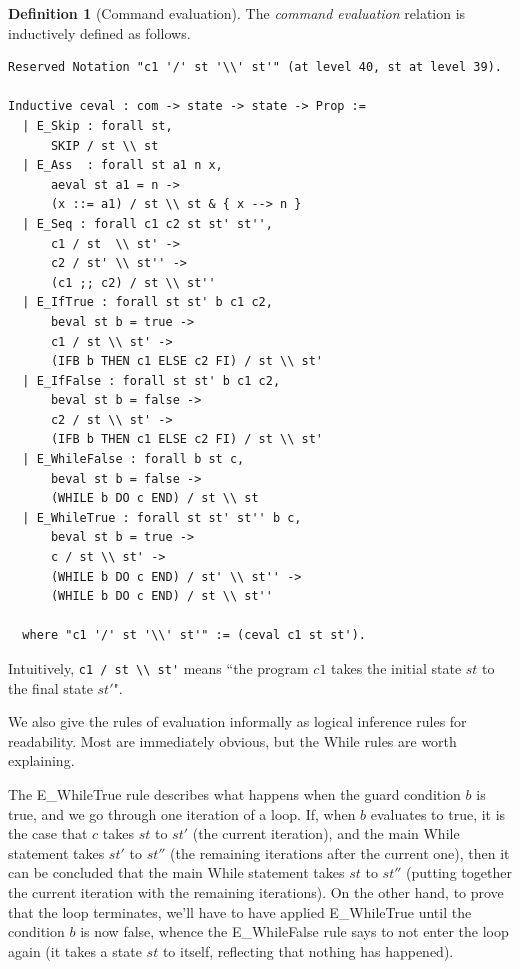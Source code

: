 \documentclass[12pt,notitlepage]{report}
\theoremstyle{plain}
\theoremstyle{definition}
\newtheorem{defin}[theo]{Definition}
\newcommand{\define}[1]{\emph{#1}\index{#1}}
\numberwithin{equation}{section}
\begin{document}
\begin{defin}[Command evaluation]\label{commeval}
The \define{command evaluation} relation is inductively defined as follows.
\begin{verbatim}
Reserved Notation "c1 '/' st '\\' st'" (at level 40, st at level 39).

Inductive ceval : com -> state -> state -> Prop :=
  | E_Skip : forall st,
      SKIP / st \\ st
  | E_Ass  : forall st a1 n x,
      aeval st a1 = n ->
      (x ::= a1) / st \\ st & { x --> n }
  | E_Seq : forall c1 c2 st st' st'',
      c1 / st  \\ st' ->
      c2 / st' \\ st'' ->
      (c1 ;; c2) / st \\ st''
  | E_IfTrue : forall st st' b c1 c2,
      beval st b = true ->
      c1 / st \\ st' ->
      (IFB b THEN c1 ELSE c2 FI) / st \\ st'
  | E_IfFalse : forall st st' b c1 c2,
      beval st b = false ->
      c2 / st \\ st' ->
      (IFB b THEN c1 ELSE c2 FI) / st \\ st'
  | E_WhileFalse : forall b st c,
      beval st b = false ->
      (WHILE b DO c END) / st \\ st
  | E_WhileTrue : forall st st' st'' b c,
      beval st b = true ->
      c / st \\ st' ->
      (WHILE b DO c END) / st' \\ st'' ->
      (WHILE b DO c END) / st \\ st''

  where "c1 '/' st '\\' st'" := (ceval c1 st st').
\end{verbatim}
Intuitively, \verb$c1 / st \\ st'$ means ``the program $c1$ takes the initial state $st$ to the final state $st'$".  
\par We also give the rules of evaluation informally as logical inference rules for readability.  Most are immediately obvious, but the While rules are worth explaining.
\par The E\_WhileTrue rule describes what happens when the guard condition $b$ is true, and we go through one iteration of a loop.  If, when $b$ evaluates to true, it is the case that $c$ takes $st$ to $st'$ (the current iteration), and the main While statement takes $st'$ to $st''$ (the remaining iterations after the current one), then it can be concluded that the main While statement takes $st$ to $st''$ (putting together the current iteration with the remaining iterations).  On the other hand, to prove that the loop terminates, we'll have to have applied E\_WhileTrue until the condition $b$ is now false, whence the E\_WhileFalse rule says to not enter the loop again (it takes a state $st$ to itself, reflecting that nothing has happened).
\end{defin}
\end{document}
